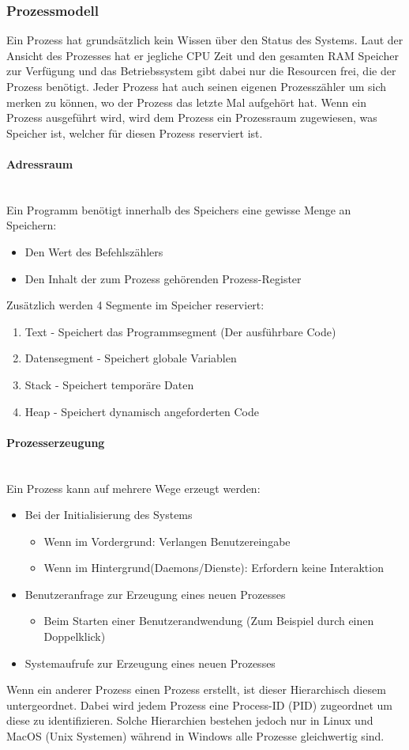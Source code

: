 \documentclass{article}
\newcommand{\paragraphlb}[1]{\paragraph{#1}\mbox{}\\}
\begin{document}
	\subsubsection{Prozessmodell}
	Ein Prozess hat grundsätzlich kein Wissen über den Status des Systems. Laut der Ansicht des Prozesses hat er jegliche CPU Zeit und den gesamten RAM Speicher zur Verfügung und das Betriebssystem gibt dabei nur die Resourcen frei, die der Prozess benötigt. Jeder Prozess hat auch seinen eigenen Prozesszähler um sich merken zu können, wo der Prozess das letzte Mal aufgehört hat. Wenn ein Prozess ausgeführt wird, wird dem Prozess ein Prozessraum zugewiesen, was Speicher ist, welcher für diesen Prozess reserviert ist.
	\paragraphlb{Adressraum}
	Ein Programm benötigt innerhalb des Speichers eine gewisse Menge an Speichern:
	\begin{itemize}
		\item{Den Wert des Befehlszählers}
		\item{Den Inhalt der zum Prozess gehörenden Prozess-Register}
	\end{itemize}
	Zusätzlich werden 4 Segmente im Speicher reserviert:
	\begin{enumerate}
		\item{Text - Speichert das Programmsegment (Der ausführbare Code)}
		\item{Datensegment - Speichert globale Variablen}
		\item{Stack - Speichert temporäre Daten}
		\item{Heap - Speichert dynamisch angeforderten Code}
	\end{enumerate}
	\paragraphlb{Prozesserzeugung}
	Ein Prozess kann auf mehrere Wege erzeugt werden:
	\begin{itemize}
		\item{Bei der Initialisierung des Systems}
		\begin{itemize}
			\item{Wenn im Vordergrund: Verlangen Benutzereingabe}
			\item{Wenn im Hintergrund(Daemons/Dienste): Erfordern keine Interaktion}
		\end{itemize}
		\item{Benutzeranfrage zur Erzeugung eines neuen Prozesses}
		\begin{itemize}
			\item{Beim Starten einer Benutzerandwendung (Zum Beispiel durch einen Doppelklick)}
		\end{itemize}
		\item{Systemaufrufe zur Erzeugung eines neuen Prozesses}
	\end{itemize}
	Wenn ein anderer Prozess einen Prozess erstellt, ist dieser Hierarchisch diesem untergeordnet. Dabei wird jedem Prozess eine Process-ID (PID) zugeordnet um diese zu identifizieren. Solche Hierarchien bestehen jedoch nur in Linux und MacOS (Unix Systemen) während in Windows alle Prozesse gleichwertig sind.
\end{document}
